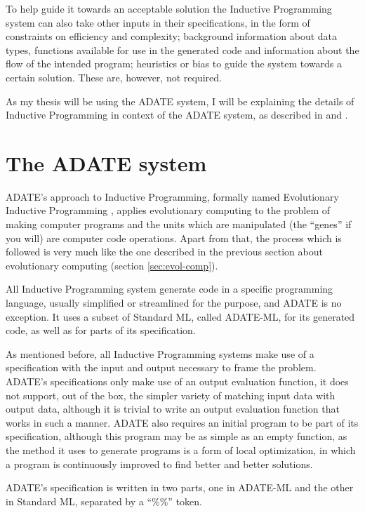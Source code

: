 \documentclass[]{report}
\begin{document}
To help guide it towards an acceptable solution the Inductive Programming system
can also take other inputs in their specifications, in the form of constraints
on efficiency and complexity; background information about data types, functions
available for use in the generated code and information about the flow of the
intended program; heuristics or bias to guide the system towards a certain
solution. These are, however, not required.

As my thesis will be using the ADATE system, I will be explaining the details of
Inductive Programming in context of the ADATE system, as described in
\citet{olsson1994inductive} and \citet{vattekar2006adate}.

\section{The ADATE system}
\label{sec:adate-system}

ADATE's approach to Inductive Programming, formally named Evolutionary Inductive
Programming \citep{crossleycombining}, applies evolutionary computing to the
problem of making computer programs and the units which are manipulated (the
``genes'' if you will) are computer code operations. Apart from that, the
process which is followed is very much like the one described in the previous
section about evolutionary computing (section \ref{sec:evol-comp}).

All Inductive Programming system generate code in a specific programming
language, usually simplified or streamlined for the purpose, and ADATE is no
exception. It uses a subset of Standard ML, called ADATE-ML, for its generated
code, as well as for parts of its specification.

As mentioned before, all Inductive Programming systems make use of a
specification with the input and output necessary to frame the problem. ADATE's
specifications only make use of an output evaluation function, it does not
support, out of the box, the simpler variety of matching input data with output
data, although it is trivial to write an output evaluation function that works
in such a manner. ADATE also requires an initial program to be part of its
specification, although this program may be as simple as an empty function, as
the method it uses to generate programs is a form of local optimization, in
which a program is continuously improved to find better and better solutions.

ADATE's specification is written in two parts, one in ADATE-ML and the other in
Standard ML, separated by a ``\%\%'' token.
\end{document}

